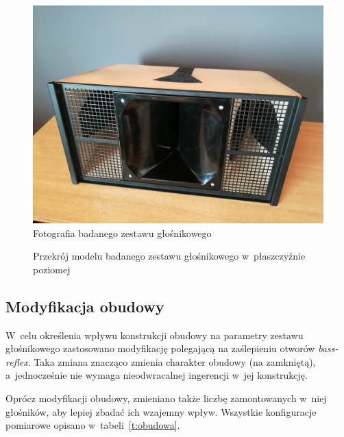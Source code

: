 \documentclass[12pt]{oska}
\begin{document}
		
		\begin{figure}[!ht]
		\centering
		\includegraphics[width=.8\textwidth]{zdjecie.jpg}
		\caption{Fotografia badanego zestawu głośnikowego}
		\label{r:zdjecie}
		\end{figure}
		
		\begin{figure}[!ht]
			\centering
			\caption{Przekrój modelu badanego zestawu głośnikowego w~płaszczyźnie poziomej}
			\label{r:przekroj}
		\end{figure}
	
	\subsection{Modyfikacja obudowy}
	
		W~celu określenia wpływu konstrukcji obudowy na parametry zestawu głośnikowego zastosowano modyfikację polegającą na zaślepieniu otworów \textit{bass-reflex}. Taka zmiana znacząco zmienia charakter obudowy (na zamkniętą), a~jednocześnie nie wymaga nieodwracalnej ingerencji w~jej konstrukcję.
		
		Oprócz modyfikacji obudowy, zmieniano także liczbę zamontowanych w~niej głośników, aby lepiej zbadać ich wzajemny wpływ. Wszystkie konfiguracje pomiarowe opisano w~tabeli~\ref{t:obudowa}.
		
\end{document}
